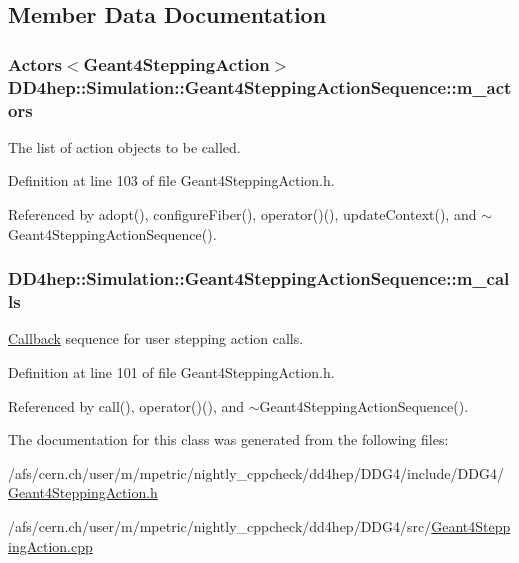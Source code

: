 \subsection{Member Data Documentation}
\hypertarget{class_d_d4hep_1_1_simulation_1_1_geant4_stepping_action_sequence_a09eb0634934bffe70733ba62589456c2}{
\subsubsection[{m\_\-actors}]{\setlength{\rightskip}{0pt plus 5cm}Actors$<${\bf Geant4SteppingAction}$>$ {\bf DD4hep::Simulation::Geant4SteppingActionSequence::m\_\-actors}}}
\label{class_d_d4hep_1_1_simulation_1_1_geant4_stepping_action_sequence_a09eb0634934bffe70733ba62589456c2}


The list of action objects to be called. 

Definition at line 103 of file Geant4SteppingAction.h.

Referenced by adopt(), configureFiber(), operator()(), updateContext(), and $\sim$Geant4SteppingActionSequence().\hypertarget{class_d_d4hep_1_1_simulation_1_1_geant4_stepping_action_sequence_a336da2773a5c1c830f1b338a32a0aa7e}{
\subsubsection[{m\_\-calls}]{ {\bf DD4hep::Simulation::Geant4SteppingActionSequence::m\_\-calls}}}
\label{class_d_d4hep_1_1_simulation_1_1_geant4_stepping_action_sequence_a336da2773a5c1c830f1b338a32a0aa7e}


\hyperlink{class_d_d4hep_1_1_callback}{Callback} sequence for user stepping action calls. 

Definition at line 101 of file Geant4SteppingAction.h.

Referenced by call(), operator()(), and $\sim$Geant4SteppingActionSequence().

The documentation for this class was generated from the following files:\begin{DoxyCompactItemize}
\item 
/afs/cern.ch/user/m/mpetric/nightly\_\-cppcheck/dd4hep/DDG4/include/DDG4/\hyperlink{_geant4_stepping_action_8h}{Geant4SteppingAction.h}\item 
/afs/cern.ch/user/m/mpetric/nightly\_\-cppcheck/dd4hep/DDG4/src/\hyperlink{_geant4_stepping_action_8cpp}{Geant4SteppingAction.cpp}\end{DoxyCompactItemize}
